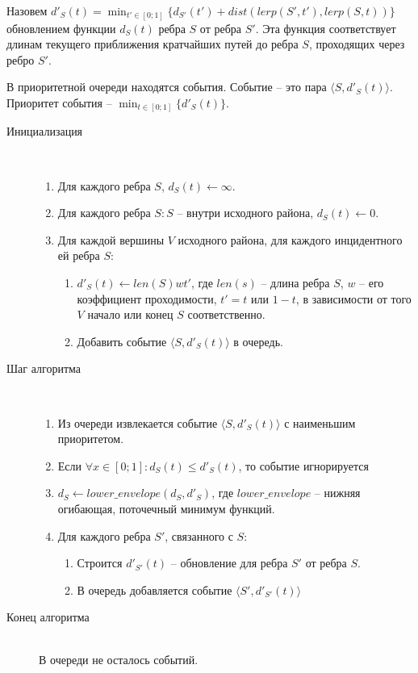 Назовем $\displaystyle d'_S(t) = \min_{t' \in [0; 1]}\{d_{S'}(t') + dist(lerp(S', t'), lerp(S, t))\}$
обновлением функции $d_S(t)$ ребра $S$ от ребра $S'$. Эта функция
соответствует длинам текущего приближения кратчайших путей до ребра $S$,
проходящих через ребро $S'$.

В приоритетной очереди находятся события. Событие -- это пара
$\langle S, d'_S(t) \rangle$. Приоритет события -- $\displaystyle\min_{t \in [0; 1]}\{d'_S(t)\}$.

\begin{description}
\item[Инициализация]\hfill \\
\begin{enumerate}
\item Для каждого ребра $S$, $d_S(t) \gets \infty$.
\item Для каждого ребра $S: S$ -- внутри исходного района, $d_S(t) \gets 0$.
\item Для каждой вершины $V$ исходного района, для каждого инцидентного ей
ребра $S$:
  \begin{enumerate}
  \item $d'_S(t) \gets len(S)wt'$, где $len(s)$ -- длина ребра $S$,
    $w$ -- его коэффициент проходимости, $t' = t$ или $1 - t$, в зависимости от
    того $V$ начало или конец $S$ соответственно.
  \item Добавить событие $\langle S, d'_S(t) \rangle$ в очередь.
  \end{enumerate}
\end{enumerate}

\item[Шаг алгоритма]\hfill \\
\begin{enumerate}
\item Из очереди извлекается событие $\langle S, d'_S(t) \rangle$ с наименьшим приоритетом.
\item Если $\forall x \in [0; 1]: d_S(t) \leq d'_S(t)$, то событие игнорируется
\item $d_S \gets lower\_envelope(d_S, d'_S)$, где $lower\_envelope$ --
нижняя огибающая, поточечный минимум функций.
\item Для каждого ребра $S'$, связанного с $S$:
  \begin{enumerate}
  \item Строится $d'_{S'}(t)$ -- обновление для ребра $S'$ от ребра $S$.
  \item В очередь добавляется событие $\langle S', d'_{S'}(t) \rangle$
  \end{enumerate}
\end{enumerate}

\item[Конец алгоритма]\hfill \\
В очереди не осталось событий.
\end{description}

